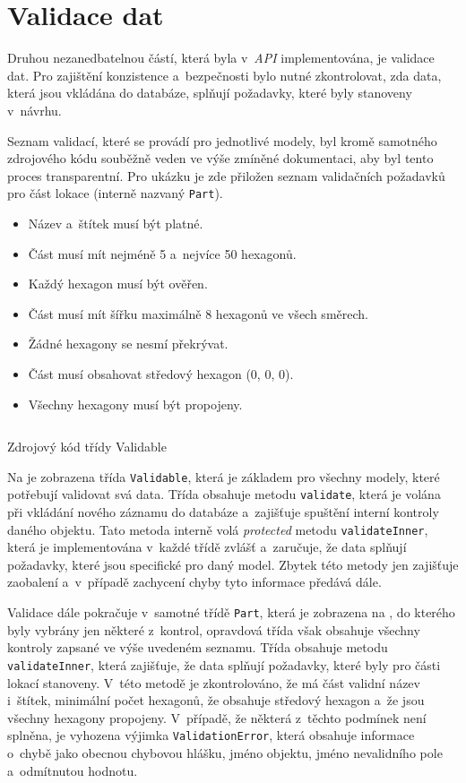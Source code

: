 \section{Validace dat}
\label{sec:validation}

Druhou nezanedbatelnou částí, která byla v~\textit{API} implementována, je validace dat. Pro zajištění konzistence a~bezpečnosti bylo nutné zkontrolovat, zda data, která jsou vkládána do databáze, splňují požadavky, které byly stanoveny v~návrhu.

Seznam validací, které se provádí pro jednotlivé modely, byl kromě samotného zdrojového kódu souběžně veden ve výše zmíněné dokumentaci, aby byl tento proces transparentní. Pro ukázku je zde přiložen seznam validačních požadavků pro část lokace (interně nazvaný \texttt{Part}).

\begin{itemize}
    \setlength\itemsep{0.5mm}
    \item Název a~štítek musí být platné.
    \item Část musí mít nejméně 5 a~nejvíce 50 hexagonů.
    \item Každý hexagon musí být ověřen.
    \item Část musí mít šířku maximálně 8 hexagonů ve všech směrech.
    \item Žádné hexagony se nesmí překrývat.
    \item Část musí obsahovat středový hexagon (0, 0, 0).
    \item Všechny hexagony musí být propojeny.
\end{itemize}

\begin{listing}[h]
    \inputminted{Java}{code/Validable.java}
    \caption{Zdrojový kód třídy Validable}
    \label{code:validable}
\end{listing}

Na  je zobrazena třída \texttt{Validable}, která je základem pro všechny modely, které potřebují validovat svá data. Třída obsahuje metodu \texttt{validate}, která je volána při vkládání nového záznamu do databáze a~zajišťuje spuštění interní kontroly daného objektu. Tato metoda interně volá \textit{protected} metodu \texttt{validateInner}, která je implementována v~každé třídě zvlášť a~zaručuje, že data splňují požadavky, které jsou specifické pro daný model. Zbytek této metody jen zajišťuje zaobalení a~v~případě zachycení chyby tyto informace předává dále.

Validace dále pokračuje v~samotné třídě \texttt{Part}, která je zobrazena na , do kterého byly vybrány jen některé z~kontrol, opravdová třída však obsahuje všechny kontroly zapsané ve výše uvedeném seznamu. Třída obsahuje metodu \texttt{validateInner}, která zajišťuje, že data splňují požadavky, které byly pro části lokací stanoveny. V~této metodě je zkontrolováno, že má část validní název i~štítek, minimální počet hexagonů, že obsahuje středový hexagon a~že jsou všechny hexagony propojeny. V~případě, že některá z~těchto podmínek není splněna, je vyhozena výjimka \texttt{ValidationError}, která obsahuje informace o~chybě jako obecnou chybovou hlášku, jméno objektu, jméno nevalidního pole a~odmítnutou hodnotu.

